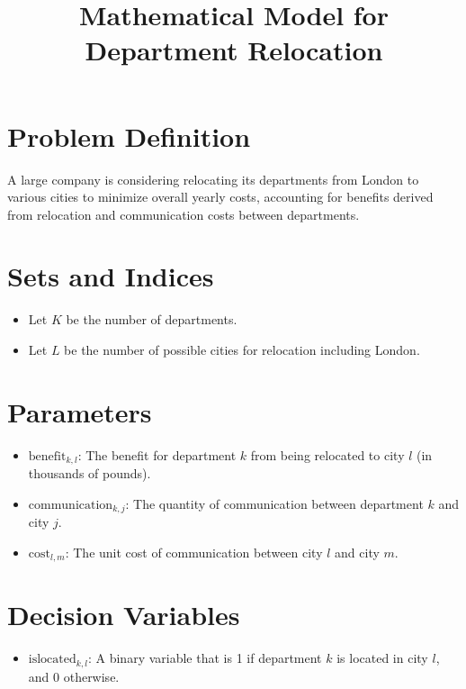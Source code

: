 \documentclass{article}
\begin{document}
\title{Mathematical Model for Department Relocation}
\author{}
\date{}
\maketitle

\section*{Problem Definition}
A large company is considering relocating its departments from London to various cities to minimize overall yearly costs, accounting for benefits derived from relocation and communication costs between departments.

\section*{Sets and Indices}
\begin{itemize}
    \item Let \( K \) be the number of departments.
    \item Let \( L \) be the number of possible cities for relocation including London.
    \end{itemize}

\section*{Parameters}
\begin{itemize}
    \item \( \text{benefit}_{k, l} \): The benefit for department \( k \) from being relocated to city \( l \) (in thousands of pounds).
    \item \( \text{communication}_{k, j} \): The quantity of communication between department \( k \) and city \( j \).
    \item \( \text{cost}_{l, m} \): The unit cost of communication between city \( l \) and city \( m \).
\end{itemize}

\section*{Decision Variables}
\begin{itemize}
    \item \( \text{islocated}_{k, l} \): A binary variable that is 1 if department \( k \) is located in city \( l \), and 0 otherwise.
\end{itemize}
\end{document}
